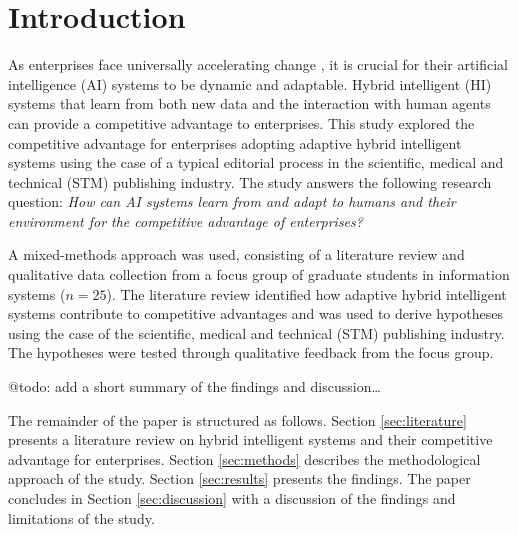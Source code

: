 \section{Introduction}
\label{sec:introduction}

As enterprises face universally accelerating change \citep{eliazarUniversalityAcceleratingChange2018}, it
is crucial for their artificial intelligence (AI) systems to be dynamic and adaptable. Hybrid intelligent (HI)
systems that learn from both new data and the interaction with human agents can provide a competitive advantage
to enterprises. This study explored the competitive advantage for enterprises adopting adaptive hybrid intelligent
systems using the case of a typical editorial process in the scientific, medical and technical (STM) publishing
industry. The study answers the following research question: \textit{How can AI systems learn from and adapt
to humans and their environment for the competitive advantage of enterprises?}

A mixed-methods approach was used, consisting of a literature review and qualitative data collection from
a focus group of graduate students in information systems ($n = 25$). The literature review identified how 
adaptive hybrid intelligent systems contribute to competitive advantages and was used to derive hypotheses
using the case of the scientific, medical and technical (STM) publishing industry. The hypotheses were
tested through qualitative feedback from the focus group.

{\color{purple} @todo: add a short summary of the findings and discussion\dots}

The remainder of the paper is structured as follows. Section \ref{sec:literature} presents a literature review
on hybrid intelligent systems and their competitive advantage for enterprises. Section \ref{sec:methods} describes
the methodological approach of the study. Section \ref{sec:results} presents the findings. The paper concludes in
Section \ref{sec:discussion} with a discussion of the findings and limitations of the study.